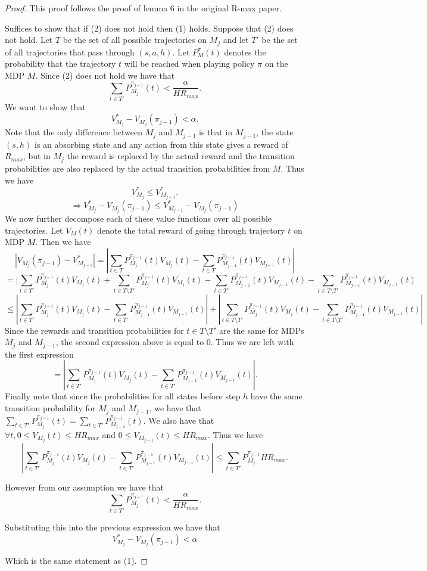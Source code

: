 \documentclass[12pt, letterpaper]{article}
\theoremstyle{definition}
\theoremstyle{remark}
\begin{document}
\begin{proof}[Proof]
    This proof follows the proof of lemma 6 in the original R-max paper.

    Suffices to show that if (2) does not hold then (1) holds. Suppose that (2) does not hold. Let \(T\) be the set of all possible trajectories on \(M_{j}\) and let \(T'\) be the set of all trajectories that pass through \((s, a, h)\). Let \(P_M^{\pi}(t)\) denotes the probability that the trajectory \(t\) will be reached when playing policy \(\pi\) on the MDP \(M\).  Since (2) does not hold we have that
    \[\sum_{t \in T'} P_{M_j}^{\pi_{j-1}}(t) < \frac{\alpha}{H R_{max}}.\]
    We want to show that
    \[V^*_{M_j} - V_{M_j}(\pi_{j-1}) < \alpha.\]
    Note that the only difference between \(M_j\) and \(M_{j-1}\) is that in \(M_{j-1}\), the state \((s, h)\) is an absorbing state and any action from this state gives a reward of \(R_{max}\), but in \(M_j\) the reward is replaced by the actual reward and the transition probabilities are also replaced by the actual transition probabilities from \(M\). Thus we have
    \[V^*_{M_j} \leq V^*_{M_{j-1}}.\]
    \[\Rightarrow V^*_{M_j} - V_{M_j}(\pi_{j-1}) \leq V^*_{M_{j-1}} - V_{M_j}(\pi_{j-1})\]
    We now further decompose each of these value functions over all possible trajectories. Let \(V_{M}(t)\) denote the total reward of going through trajectory \(t\) on MDP \(M\). Then we have
    \[ |V_{M_j}(\pi_{j-1}) - V_{M_{j-1}}^* | = |\sum_{t \in T} P_{M_j}^{\pi_{j-1}}(t) V_{M_j}(t) - \sum_{t \in T} P_{M_{j-1}}^{\pi_{j-1}}(t) V_{M_{j-1}}(t)|\]
    \[= |\sum_{t \in T'} P_{M_j}^{\pi_{j-1}}(t) V_{M_j}(t) + \sum_{t \in T \setminus T'} P_{M_j}^{\pi_{j-1}}(t) V_{M_j}(t) - \sum_{t \in T'} P_{M_{j-1}}^{\pi_{j-1}}(t) V_{M_{j-1}}(t) - \sum_{t \in T \setminus T'} P_{M_{j-1}}^{\pi_{j-1}}(t) V_{M_{j-1}}(t)\]
    \[\leq |\sum_{t \in T'} P_{M_j}^{\pi_{j-1}}(t) V_{M_j}(t) - \sum_{t \in T'} P_{M_{j-1}}^{\pi_{j-1}}(t) V_{M_{j-1}}(t)| + |\sum_{t \in T \setminus T'} P_{M_j}^{\pi_{j-1}}(t) V_{M_j}(t) -  \sum_{t \in T \setminus T'} P_{M_{j-1}}^{\pi_{j-1}}(t) V_{M_{j-1}}(t)|\]
    Since the rewards and transition probabilities for \(t \in T \setminus T'\) are the same for MDPs \(M_j\) and \(M_{j-1}\), the second expression above is equal to 0. Thus we are left with the first expression
    \[= |\sum_{t \in T'} P_{M_j}^{\pi_{j-1}}(t) V_{M_j}(t) - \sum_{t \in T'} P_{M_{j-1}}^{\pi_{j-1}}(t) V_{M_{j-1}}(t)|.\]
    Finally note that since the probabilities for all states before step \(h\) have the same transition probability for \(M_j\) and \(M_{j-1}\), we have that \(\sum_{t \in T'} P_{M_j}^{\pi_{j-1}}(t) = \sum_{t \in T'} P_{M_{j-1}}^{\pi_{j-1}}(t)\). We also have that \(\forall t, 0 \leq V_{M_j}(t) \leq HR_{max}\) and \(0 \leq V_{M_{j-1}}(t) \leq HR_{max}\). Thus we have
    \[|\sum_{t \in T'} P_{M_j}^{\pi_{j-1}}(t) V_{M_j}(t) - \sum_{t \in T'} P_{M_{j-1}}^{\pi_{j-1}}(t) V_{M_{j-1}}(t)| \leq \sum_{t \in T'} P_{M_j}^{\pi_{j-1}} H R_{max}.\]
    
    However from our assumption we have that 
    \[\sum_{t \in T'} P_{M_j}^{\pi_{j-1}}(t) < \frac{\alpha}{H R_{max}}.\]

    Substituting this into the previous expression we have that
    \[V^*_{M_j} - V_{M_j}(\pi_{j-1}) < \alpha\]
    
    Which is the same statement as (1).
\end{proof}
\end{document}
